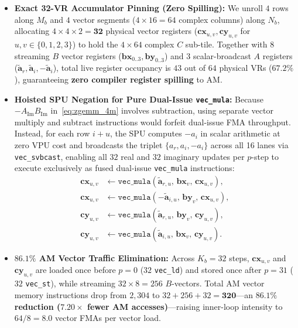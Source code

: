 \documentclass[conference]{IEEEtran}
\begin{document}
\begin{itemize}\setlength{\itemsep}{1pt}\setlength{\parskip}{0pt}
    \item \textbf{Exact 32-VR Accumulator Pinning (Zero Spilling):} We unroll $4$ rows along $M_b$ and $4$ vector segments ($4 \times 16 = 64$ complex columns) along $N_b$, allocating $4 \times 4 \times 2 = \mathbf{32}$ physical vector registers ($\mathbf{cx}_{u,v}, \mathbf{cy}_{u,v}$ for $u,v \in \{0,1,2,3\}$) to hold the $4 \times 64$ complex $C$ sub-tile. Together with $8$ streaming $B$ vector registers ($\mathbf{bx}_{0..3}, \mathbf{by}_{0..3}$) and $3$ scalar-broadcast $A$ registers ($\tilde{\mathbf{a}}_r, \tilde{\mathbf{a}}_i, -\tilde{\mathbf{a}}_i$), total live register occupancy is $43$ out of $64$ physical VRs ($67.2\%$), guaranteeing \textbf{zero compiler register spilling} to AM.
    \item \textbf{Hoisted SPU Negation for Pure Dual-Issue \texttt{vec\_mula}:} Because $-A_{\mathrm{Im}} B_{\mathrm{Im}}$ in~\eqref{eq:zgemm_4m} involves subtraction, using separate vector multiply and subtract instructions would forfeit dual-issue FMA throughput. Instead, for each row $i+u$, the SPU computes $-a_i$ in scalar arithmetic at zero VPU cost and broadcasts the triplet $\{a_r, a_i, -a_i\}$ across all 16 lanes via \texttt{vec\_svbcast}, enabling all $32$ real and $32$ imaginary updates per $p$-step to execute exclusively as fused dual-issue \texttt{vec\_mula} instructions:
    \begin{equation}
    \begin{aligned}
    \mathbf{cx}_{u,v} &\leftarrow \texttt{vec\_mula}(\tilde{\mathbf{a}}_{r,u},\, \mathbf{bx}_v,\, \mathbf{cx}_{u,v}), \\
    \mathbf{cx}_{u,v} &\leftarrow \texttt{vec\_mula}(-\tilde{\mathbf{a}}_{i,u},\, \mathbf{by}_v,\, \mathbf{cx}_{u,v}), \\
    \mathbf{cy}_{u,v} &\leftarrow \texttt{vec\_mula}(\tilde{\mathbf{a}}_{r,u},\, \mathbf{by}_v,\, \mathbf{cy}_{u,v}), \\
    \mathbf{cy}_{u,v} &\leftarrow \texttt{vec\_mula}(\tilde{\mathbf{a}}_{i,u},\, \mathbf{bx}_v,\, \mathbf{cy}_{u,v}).
    \end{aligned}
    \label{eq:vec_mula}
    \end{equation}
    \item \textbf{$86.1\%$ AM Vector Traffic Elimination:} Across $K_b = 32$ steps, $\mathbf{cx}_{u,v}$ and $\mathbf{cy}_{u,v}$ are loaded once before $p=0$ ($32$ \texttt{vec\_ld}) and stored once after $p=31$ ($32$ \texttt{vec\_st}), while streaming $32 \times 8 = 256$ $B$-vectors. Total AM vector memory instructions drop from $2{,}304$ to $32 + 256 + 32 = \mathbf{320}$---an \textbf{$86.1\%$ reduction ($7.20\times$ fewer AM accesses)}---raising inner-loop intensity to $64 / 8 = \mathbf{8.0}$ vector FMAs per vector load.
\end{itemize}
\end{document}
